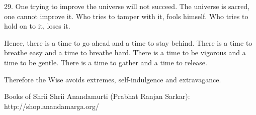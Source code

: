 \documentclass[10pt,a4paper]{book}
\begin{document}
29.
One trying to improve the universe will not succeed.
The universe is sacred, one cannot improve it.
Who tries to tamper with it, fools himself.
Who tries to hold on to it, loses it.

Hence, there is a time to go ahead and a time to stay behind.
There is a time to breathe easy and a time to breathe hard.
There is a time to be vigorous and a time to be gentle.
There is a time to gather and a time to release.

Therefore the Wise avoids extremes, self-indulgence and extravagance.


\backmatter

\begin{thebibliography}{99}

Books of Shrii Shrii Anandamurti (Prabhat Ranjan Sarkar): \\
http://shop.anandamarga.org/

\end{thebibliography}
\end{document}
